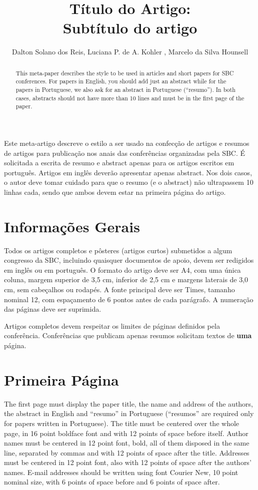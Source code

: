 \documentclass[12pt]{article}
\title{Título do Artigo:\\ Subtítulo do artigo}
\author{Dalton Solano dos Reis\inst{1}, Luciana P. de A. Kohler \inst{1}, Marcelo da Silva Hounsell\inst{2} }
\begin{document}
 

\maketitle

\begin{abstract}
  This meta-paper describes the style to be used in articles and short papers for SBC conferences. For papers in English, you should add just an abstract while for the papers in Portuguese, we also ask for an abstract in Portuguese (``resumo''). In both cases, abstracts should not have more than 10 lines and must be in the first page of the paper.
\end{abstract}
     
\begin{resumo} 
  Este meta-artigo descreve o estilo a ser usado na confecção de artigos e resumos de artigos para publicação nos anais das conferências organizadas pela SBC. É solicitada a escrita de resumo e abstract apenas para os artigos escritos em português. Artigos em inglês deverão apresentar apenas abstract. Nos dois casos, o autor deve tomar cuidado para que o resumo (e o abstract) não ultrapassem 10 linhas cada, sendo que ambos devem estar na primeira página do artigo.
\end{resumo}

\section{Informações Gerais}

Todos os artigos completos e pôsteres (artigos curtos) submetidos a algum congresso da SBC, incluindo quaisquer documentos de apoio, devem ser redigidos em inglês ou em português. O formato do artigo deve ser A4, com uma única coluna, margem superior de 3,5 cm, inferior de 2,5 cm e margens laterais de 3,0 cm, sem cabeçalhos ou rodapés. A fonte principal deve ser Times, tamanho nominal 12, com espaçamento de 6 pontos antes de cada parágrafo. A numeração das páginas deve ser suprimida.

Artigos completos devem respeitar os limites de páginas definidos pela conferência. Conferências que publicam apenas resumos solicitam textos de \textbf{uma} página.

\section{Primeira Página} \label{sec:firstpage}

The first page must display the paper title, the name and address of the
authors, the abstract in English and ``resumo'' in Portuguese (``resumos'' are
required only for papers written in Portuguese). The title must be centered
over the whole page, in 16 point boldface font and with 12 points of space
before itself. Author names must be centered in 12 point font, bold, all of
them disposed in the same line, separated by commas and with 12 points of
space after the title. Addresses must be centered in 12 point font, also with
12 points of space after the authors' names. E-mail addresses should be
written using font Courier New, 10 point nominal size, with 6 points of space
before and 6 points of space after.
\end{document}
